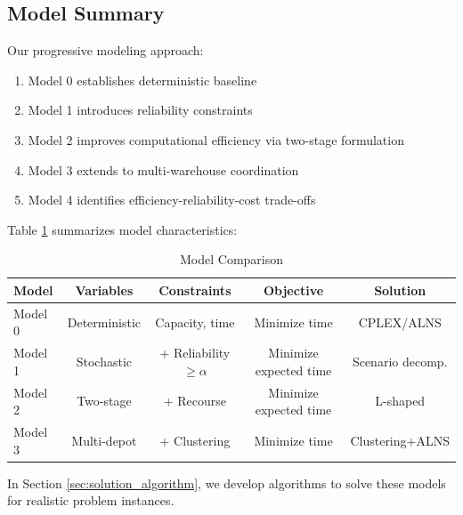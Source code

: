 \subsection{Model Summary}

Our progressive modeling approach:
\begin{enumerate}
\item Model 0 establishes deterministic baseline
\item Model 1 introduces reliability constraints
\item Model 2 improves computational efficiency via two-stage formulation
\item Model 3 extends to multi-warehouse coordination
\item Model 4 identifies efficiency-reliability-cost trade-offs
\end{enumerate}

Table \ref{tab:model_comparison} summarizes model characteristics:

\begin{table}[H]
\centering
\caption{Model Comparison}
\label{tab:model_comparison}
\begin{tabular}{lcccc}
\toprule
Model & Variables & Constraints & Objective & Solution \\
\midrule
Model 0 & Deterministic & Capacity, time & Minimize time & CPLEX/ALNS \\
Model 1 & Stochastic & + Reliability $\geq \alpha$ & Minimize expected time & Scenario decomp. \\
Model 2 & Two-stage & + Recourse & Minimize expected time & L-shaped \\
Model 3 & Multi-depot & + Clustering & Minimize time & Clustering+ALNS \\
\bottomrule
\end{tabular}
\end{table}

In Section \ref{sec:solution_algorithm}, we develop algorithms to solve these models for realistic problem instances.
